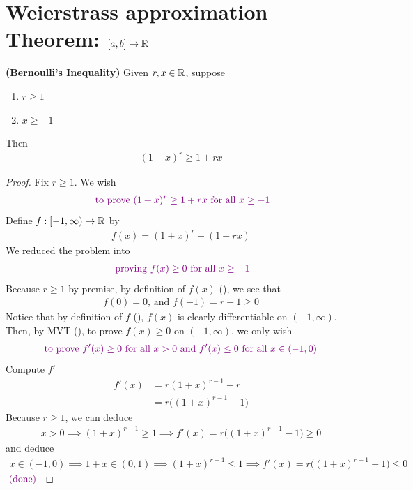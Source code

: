 \documentclass{report}
\begin{document}
\section{Weierstrass approximation Theorem: $[a,b]\rightarrow \mathbb{R}$}
\begin{theorem}
\label{Bernoulli's Inequality}
\textbf{(Bernoulli's Inequality)} Given $r,x \in\mathbb{R}$, suppose 
\begin{enumerate}[label=(\alph*)]
  \item $r\geq 1$ 
  \item $x\geq -1$
\end{enumerate}
Then
\begin{align*}
  (1+x)^r\geq 1+rx
\end{align*}
\end{theorem}
\begin{proof}
Fix $r\geq 1$. We wish 
\begin{align*}
\textcolor{violet}{\text{ to prove }(1+x)^r\geq 1+rx\text{ for all  }x \geq -1}
\end{align*}
Define $f:[-1,\infty)\rightarrow \mathbb{R}$ by 
 \begin{align}
\label{Bere1}
f(x)=(1+x)^r-(1+rx)
\end{align}
We reduced the problem into  
\begin{align*}
\textcolor{violet}{\text{ proving }f(x)\geq 0\text{ for all } x\geq -1}
\end{align*}
Because $r\geq 1$ by premise, by definition of $f(x)$  (), we see that 
\begin{align*}
f(0)=0\text{, and }f(-1)=r-1\geq 0
\end{align*}
Notice that by definition of $f$  (),  $f(x)$ is clearly differentiable on $(-1,\infty)$.\\

Then, by MVT (), to prove $f(x)\geq 0$ on $(-1,\infty)$, we only wish 
\begin{align*}
\textcolor{violet}{\text{ to prove }f'(x)\geq 0\text{ for all }x> 0\text{ and }f'(x)\leq 0\text{ for all $x \in (-1,0)$ }}
\end{align*}
Compute $f'$
 \begin{align*}
f'(x)&=r(1+x)^{r-1}-r\\
&=r\Big((1+x)^{r-1}-1 \Big)
\end{align*}
Because $r\geq 1$, we can deduce 
\begin{align*}
x>0 \implies (1+x)^{r-1}\geq 1 \implies f'(x)=r\Big((1+x)^{r-1}-1 \Big)\geq 0
\end{align*}
and deduce 
\begin{align*}
x \in (-1,0) \implies 1+x \in (0,1) \implies (1+x)^{r-1}\leq 1 \implies f'(x)=r\Big((1+x)^{r-1}-1 \Big)\leq  0
\end{align*}
$\textcolor{violet}{\text{ (done) }}$
\end{proof}
\end{document}
